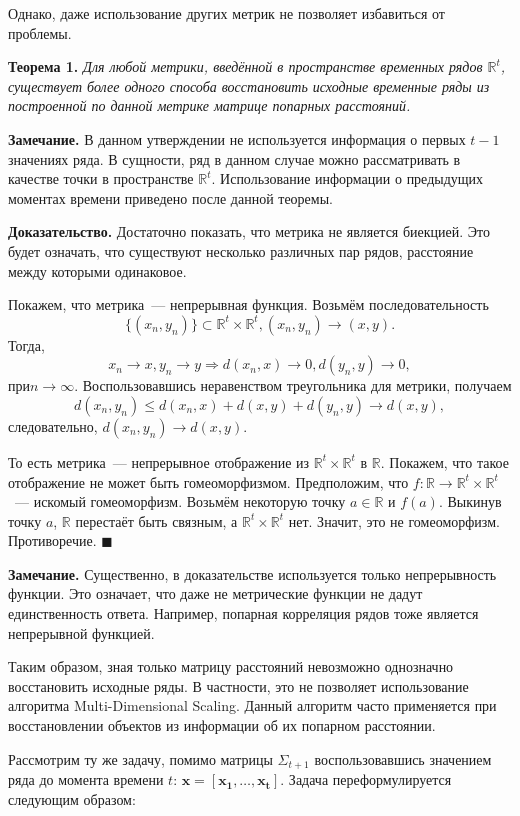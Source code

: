 \documentclass{article}
\begin{document}
Однако, даже использование других метрик не позволяет избавиться от проблемы.

\textbf{Теорема 1.} \textit{Для любой метрики, введённой в пространстве временных рядов $\mathbb{R}^t$, существует более одного способа восстановить исходные временные ряды из построенной по данной метрике матрице попарных расстояний.}

\textbf{Замечание.} В данном утверждении не используется информация о первых $t-1$ значениях ряда. В сущности, ряд в данном случае можно рассматривать в качестве точки в пространстве $\mathbb{R}^t$. Использование информации о предыдущих моментах времени приведено после данной теоремы.

\textbf{Доказательство.} Достаточно показать, что метрика не является биекцией. Это будет означать, что существуют несколько различных пар рядов, расстояние между которыми одинаковое.

Покажем, что метрика~--- непрерывная функция. Возьмём последовательность \[\{(x_n, y_n)\} \subset \mathbb{R}^t \times \mathbb{R}^t, (x_n, y_n) \to (x, y).\] Тогда, \[x_n\to x, y_n\to y \Rightarrow d(x_n,x)\to 0 ,d(y_n,y)\to 0,\] $при n \to \infty.$ Воспользовавшись неравенством треугольника для метрики, получаем \[d(x_n,y_n)\leqslant d(x_n,x)+d(x,y)+d(y_n,y)\to d(x,y),\] следовательно, $d(x_n,y_n)\to d(x,y)$.

То есть метрика~--- непрерывное отображение из $\mathbb{R}^t \times \mathbb{R}^t$ в $\mathbb{R}$. Покажем, что такое отображение не может быть гомеоморфизмом. Предположим, что $f: \mathbb{R} \to \mathbb{R}^t \times \mathbb{R}^t$~--- искомый гомеоморфизм. Возьмём некоторую точку $a \in \mathbb{R}$ и $f(a)$. Выкинув точку $a$, $\mathbb{R}$ перестаёт быть связным, а $\mathbb{R}^t \times \mathbb{R}^t$ нет. Значит, это не гомеоморфизм. Противоречие.
$\blacksquare$

\textbf{Замечание.} Существенно, в доказательстве используется только непрерывность функции. Это означает, что даже не метрические функции не дадут единственность ответа. Например, попарная корреляция рядов тоже является непрерывной функцией.

Таким образом, зная только матрицу расстояний невозможно однозначно восстановить исходные ряды. В частности, это не позволяет использование алгоритма Multi-Dimensional Scaling. Данный алгоритм часто применяется при восстановлении объектов из информации об их попарном расстоянии.

Рассмотрим ту же задачу, помимо матрицы $\Sigma_{t+1}$ воспользовавшись значением ряда до момента времени $t$: $\mathbf{x}=[\mathbf{x_1}, \ldots, \mathbf{x_{t}}]$. Задача переформулируется следующим образом:
\end{document}
